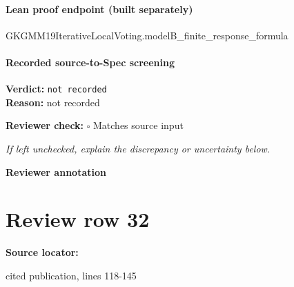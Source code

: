 \documentclass[10pt]{article}
\newcommand{\reviewerbox}{%
  \par\noindent\fbox{\parbox{0.96\linewidth}{\rule{0pt}{0.38in}}}\par
}
\newcommand{\reviewmatch}[1]{%
  \par\noindent\textbf{Reviewer check:} $\square$\; #1\par
  \noindent\emph{If left unchecked, explain the discrepancy or uncertainty below.}\par
}
\begin{document}
\paragraph{Lean proof endpoint (built separately)}\begin{ReviewVerbatim}
GKGMM19IterativeLocalVoting.modelB_finite_response_formula
\end{ReviewVerbatim}

\paragraph{Recorded source-to-Spec screening}
\textbf{Verdict:} \texttt{not recorded}
\\
\textbf{Reason:} not recorded
\reviewmatch{Matches source input}
\noindent\textbf{Reviewer annotation}\par
\reviewerbox
\clearpage
\hypertarget{source-claim-057affe0833911ec}{}
\section*{Review row 32}
\textbf{Source locator:} {\footnotesize\raggedright cited publication, lines 118-\allowbreak{}145\par}
\end{document}
